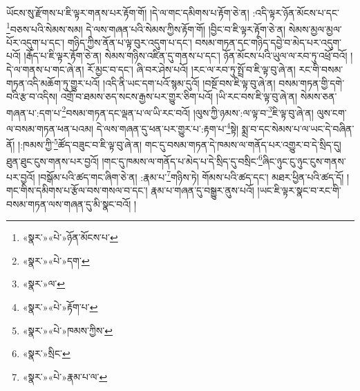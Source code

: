 ཡོངས་སུ་རྫོགས་པ་ཇི་ལྟར་གནས་པར་རྟོག་གོ། །དེ་ལ་གང་དམིགས་པ་རྟོག་ཅེ་ན། :འདི་ལྟར་ཉོན་མོངས་པ་དང་\footnote{«སྣར་»«པེ་»ཉོན་མོངས་པ་}བཅས་པའི་སེམས་སམ། དེ་ལས་གཞན་པའི་སེམས་ཀྱིས་རྟོག་གོ། །བྱིང་བ་ཇི་ལྟར་རྟོག་ཅེ་ན། སེམས་མྱལ་མྱལ་པོར་འདུག་པ་དང་། གཉིད་ཀྱིས་ནོན་པ་ལྟ་བུར་འདུག་པ་དང་། བསམ་གཏན་དང་གཉིད་དབྱེ་བ་མེད་པར་འདུག་པའོ། །རྒོད་པ་ཇི་ལྟར་རྟོག་ཅེ་ན། སེམས་གཉིས་འཛིན་དུ་གནས་པ་དང་། ཉོན་མོངས་པའི་ཡུལ་ལ་རབ་ཏུ་འཕྲོ་བའོ། །དེ་ལ་གནས་པ་གང་ཞེ་ན། རོ་མྱང་བ་དང་། ཞི་བར་ཤེས་པའོ། །རང་ལ་རབ་ཏུ་སྤྲོ་བ་ཇི་ལྟ་བུ་ཞེ་ན། རང་གི་བསམ་གཏན་འདི་མཆོག་ཏུ་གྱུར་པའོ། །འདི་ནི་ཡང་དག་པའོ་སྙམ་དུའོ། །བསྔོ་བས་ཇི་ལྟ་བུ་ཞེ་ན། བསམ་གཏན་གྱི་དགེ་བའི་རྩ་བ་འདིས། འགྲོ་བ་ཐམས་ཅད་སངས་རྒྱས་པར་གྱུར་ཅིག་པའོ། །ཡི་རང་བས་ཇི་ལྟ་བུ་ཞེ་ན། སེམས་ཅན་གཞན་པ་:དག་པ་\footnote{«སྣར་»«པེ་»དག་}བསམ་གཏན་དང་ལྡན་པ་ལ་ཡི་རང་བའོ། །ལུས་ཀྱི་ཉམས་:ལ་ལྟ་བ་\footnote{«སྣར་»ལ་}ཇི་ལྟ་བུ་ཞེ་ན། ལུས་ངག་ལ་བསམ་གཏན་ཕན་པའམ། དེ་ལས་གཞན་དུ་ཕན་པར་གྱུར་པ་:རྟག་པ་\footnote{«སྣར་»«པེ་»རྟོག་པ་}སྟེ། སྨྲ་བ་དང་སེམས་པ་ལ་ཡང་དེ་བཞིན་ནོ། །:ཁམས་ཀྱི་\footnote{«སྣར་»«པེ་»ཁམས་ཀྱིས་}ཚོད་བཟུང་བ་ཇི་ལྟ་བུ་ཞེ་ན། གང་དུ་བསམ་གཏན་དེ་ཁམས་ལ་གནོད་པར་འགྱུར་བ་དེ་སྲིད་དུ། ཐུན་ཐུང་ངུས་གནས་པར་བྱའོ། །གང་དུ་ཁམས་ལ་གནོད་པ་མེད་པ་དེ་སྲིད་དུ་བསྲིང་\footnote{«སྣར་»སྲིང་}ཞིང་ཉུང་ངུ་ཉུང་ངུས་གནས་པར་བྱའོ། །བསྒོམ་པའི་ཚད་གང་ཞིག་ཅེ་ན། :རྣམ་པ་\footnote{«སྣར་»«པེ་»རྣམ་པ་ལ་}གཉིས་ཏེ། གོམས་པའི་ཚད་དང་། མཐར་ཕྱིན་པའི་ཚད་དོ། །གང་གིས་དམིགས་པ་རྩོལ་བས་གསལ་བ་དང་། རྣམ་པ་གཞན་དུ་བསྒྱུར་ནུས་པའོ། །ཡང་ཇི་ལྟར་སྣང་བ་རང་གི་བསམ་གཏན་ལས་གཞན་དུ་མི་སྣང་བའོ། །
